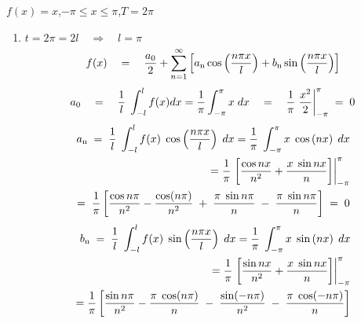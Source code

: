 \documentclass[12pt]{article}
\newcommand*\Eval[3]{\left.#1\right\rvert_{#2}^{#3}}
\begin{document}
\section{}
		$f(x) = x$,\quad $-\pi \le x \le \pi$,\quad $T = 2\pi$
        \begin{enumerate}[label=S.]
   		\item  
            $t=2\pi = 2l \quad\Rightarrow\quad l = \pi$
            \begin{equation} 
            f(x) \quad=\quad \frac{a\textsubscript{0}}{2} + \sum_{n=1}^{\infty}\left[a\textsubscript{n} \cos \left(\frac{n \pi x}{l}\right) + b\textsubscript{n} \sin \left(\frac{n \pi x}{l}\right)\right]
            \end{equation}
            \begin{equation} 
             {a\textsubscript{0}} \quad=\quad
             \frac{1}{l}\; \int_{-l}^{l} f(x) dx = \frac{1}{\pi} \int_{-\pi}^{\pi} x \;dx \quad=\quad \frac{1}{\pi} \Eval{\frac{x^{2}}{2}}{-\pi}{\pi} \;=\; 0
            \end{equation}
            \begin{equation}
            \begin{split}
            {a\textsubscript{n}} \;=\; \frac{1}{l} \;\int_{-l}^{l} f(x)\; \cos \left(\frac{n \pi x}{l}\right) \;dx = \frac{1}{\pi} \;\int_{-\pi}^{\pi} x\; \cos \left(n x\right) \;dx\\ = \frac{1}{\pi}\Eval{\left[\frac{\cos nx}{n^{2}}+\frac{x\; \sin nx}{n}\right]}{-\pi}{\pi}\\
=\; \frac{1}{\pi}\left[\frac{\cos n\pi}{n^{2}}-\frac{\cos (n\pi)}{n^{2}}\;+\;\frac{\pi\; \sin n\pi}{n} \;-\; \frac{\pi\; \sin n\pi}{n}\right] \;=\; 0
            \end{split}
            \end{equation}
            \begin{equation}
            \begin{split}
            {b\textsubscript{n}} \;=\; \frac{1}{l} \;\int_{-l}^{l} f(x)\; \sin \left(\frac{n \pi x}{l}\right) \;dx = \frac{1}{\pi} \;\int_{-\pi}^{\pi} x\; \sin \left(n x\right) \;dx\\ = \frac{1}{\pi}\Eval{\left[\frac{\sin nx}{n^{2}}+\frac{x\; \sin nx}{n}\right]}{-\pi}{\pi} \\
 =\frac{1}{\pi}\left[\frac{\sin n\pi}{n^{2}}-\frac{\pi\; \cos (n\pi)}{n}\;-\;\frac{\sin (-n\pi)}{n^{2}} \;-\; \frac{\pi\; \cos (-n\pi)}{n}\right]
            \end{split}
            \end{equation}

\end{enumerate}
\end{document}
